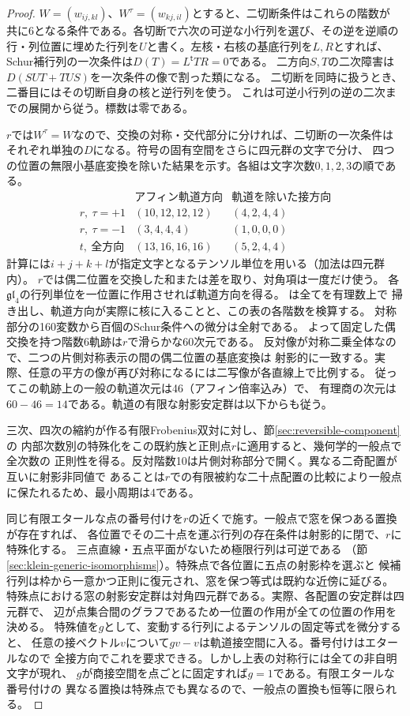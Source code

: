 \begin{proof}
$W=(w_{ij,kl})$、$W^\tau=(w_{kj,il})$とすると、二切断条件はこれらの階数が
共に6となる条件である。各切断で六次の可逆な小行列を選び、その逆を逆順の
行・列位置に埋めた行列を$U$と書く。左核・右核の基底行列を$L,R$とすれば、
Schur補行列の一次条件は$D(T)=L^{\mathsf t}TR=0$である。
二方向$S,T$の二次障害は$D(SUT+TUS)$を一次条件の像で割った類になる。
二切断を同時に扱うとき、二番目にはその切断自身の核と逆行列を使う。
これは可逆小行列の逆の二次までの展開から従う。標数は零である。

$r$では$W^\tau=W$なので、交換の対称・交代部分に分ければ、二切断の一次条件は
それぞれ単独の$D$になる。符号の固有空間をさらに四元群の文字で分け、
四つの位置の無限小基底変換を除いた結果を示す。各組は文字次数$0,1,2,3$の順である。
\[
\begin{array}{c|c|c}
 &\text{アフィン軌道方向}&\text{軌道を除いた接方向}\\\hline
r,\ \tau=+1 &(10,12,12,12)&(4,2,4,4)\\
r,\ \tau=-1 &(3,4,4,4)&(1,0,0,0)\\
t,\ \text{全方向}&(13,16,16,16)&(5,2,4,4)
\end{array}
\]
計算には$ i+j+k+l$が指定文字となるテンソル単位を用いる（加法は四元群内）。
$r$では偶二位置を交換した和または差を取り、対角項は一度だけ使う。
各$\mathfrak{gl}_4$の行列単位を一位置に作用させれば軌道方向を得る。
は全てを有理数上で
掃き出し、軌道方向が実際に核に入ることと、この表の各階数を検算する。
対称部分の160変数から百個のSchur条件への微分は全射である。
よって固定した偶交換を持つ階数6軌跡は$r$で滑らかな60次元である。
反対像が対称二乗全体なので、二つの片側対称表示の間の偶二位置の基底変換は
射影的に一致する。実際、任意の平方の像が再び対称になるには二写像が各直線上で比例する。
従ってこの軌跡上の一般の軌道次元は46（アフィン倍率込み）で、
有理商の次元は$60-46=14$である。軌道の有限な射影安定群は以下からも従う。

三次、四次の縮約が作る有限Frobenius双対に対し、節\ref{sec:reversible-component}の
内部次数別の特殊化をこの既約族と正則点$r$に適用すると、幾何学的一般点で全次数の
正則性を得る。反対階数10は片側対称部分で開く。異なる二奇配置が互いに射影非同値で
あることは$r$での有限被約な二十点配置の比較により一般点に保たれるため、最小周期は4である。

同じ有限エタールな点の番号付けを$r$の近くで施す。一般点で窓を保つある置換が存在すれば、
各位置でその二十点を運ぶ行列の存在条件は射影的に閉で、$r$に特殊化する。
三点直線・五点平面がないため極限行列は可逆である
（節\ref{sec:klein-generic-isomorphisms}）。特殊点で各位置に五点の射影枠を選ぶと
候補行列は枠から一意かつ正則に復元され、窓を保つ等式は既約な近傍に延びる。
特殊点における窓の射影安定群は対角四元群である。実際、各配置の安定群は四元群で、
辺が点集合間のグラフであるため一位置の作用が全ての位置の作用を決める。
特殊値を$g$として、変動する行列によるテンソルの固定等式を微分すると、
任意の接ベクトル$v$について$gv-v$は軌道接空間に入る。番号付けはエタールなので
全接方向でこれを要求できる。しかし上表の対称行には全ての非自明文字が現れ、
$g$が商接空間を点ごとに固定すれば$g=1$である。有限エタールな番号付けの
異なる置換は特殊点でも異なるので、一般点の置換も恒等に限られる。


\end{proof}
